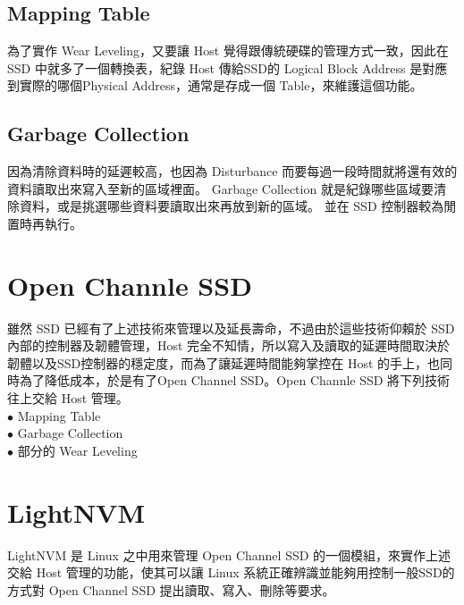 \subsection{Mapping Table}\label{s2.2.3}
\indent
為了實作 Wear Leveling，又要讓 Host 覺得跟傳統硬碟的管理方式一致，因此在 SSD 中就多了一個轉換表，紀錄 Host 傳給SSD的 Logical Block Address 是對應到實際的哪個Physical Address，通常是存成一個 Table，來維護這個功能。

\subsection{Garbage Collection}\label{s2.2.4}
\indent
因為清除資料時的延遲較高，也因為 Disturbance 而要每過一段時間就將還有效的資料讀取出來寫入至新的區域裡面。
Garbage Collection 就是紀錄哪些區域要清除資料，或是挑選哪些資料要讀取出來再放到新的區域。
並在 SSD 控制器較為閒置時再執行。

\section{Open Channle SSD}\label{s2.3}
\indent
雖然 SSD 已經有了上述技術來管理以及延長壽命，不過由於這些技術仰賴於 SSD 內部的控制器及韌體管理，Host 完全不知情，所以寫入及讀取的延遲時間取決於韌體以及SSD控制器的穩定度，而為了讓延遲時間能夠掌控在 Host 的手上，也同時為了降低成本，於是有了Open Channel SSD。Open Channle SSD 將下列技術往上交給 Host 管理。\\
$\bullet$ Mapping Table \\
$\bullet$ Garbage Collection \\
$\bullet$ 部分的 Wear Leveling

\section{LightNVM}\label{s2.4}
\indent
LightNVM 是 Linux 之中用來管理 Open Channel SSD 的一個模組，來實作上述交給 Host 管理的功能，使其可以讓 Linux 系統正確辨識並能夠用控制一般SSD的方式對 Open Channel SSD 提出讀取、寫入、刪除等要求。